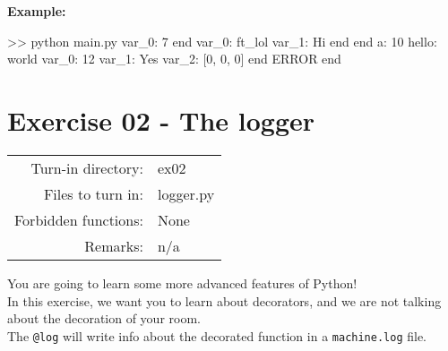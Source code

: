 \documentclass[]{article}
\newenvironment{Shaded}{\begin{snugshade}}{\end{snugshade}}
\newcommand{\NormalTok}[1]{\textcolor[rgb]{0.81,0.81,0.76}{#1}}
\begin{document}
\textbf{Example:}

\begin{Shaded}
\begin{Highlighting}[]
\NormalTok{>> python main.py}
\NormalTok{var_0: 7}
\NormalTok{end}
\NormalTok{var_0: ft_lol}
\NormalTok{var_1: Hi}
\NormalTok{end}
\NormalTok{end}
\NormalTok{a: 10}
\NormalTok{hello: world}
\NormalTok{var_0: 12}
\NormalTok{var_1: Yes}
\NormalTok{var_2: [0, 0, 0]}
\NormalTok{end}
\NormalTok{ERROR}
\NormalTok{end}
\end{Highlighting}
\end{Shaded}

\clearpage

\hypertarget{exercise-02---the-logger-1}{%
\section{Exercise 02 - The logger}\label{exercise-02---the-logger-1}}

\begin{longtable}[]{@{}rl@{}}
\toprule
\endhead
Turn-in directory: & ex02\tabularnewline
Files to turn in: & logger.py\tabularnewline
Forbidden functions: & None\tabularnewline
Remarks: & n/a\tabularnewline
\bottomrule
\end{longtable}

You are going to learn some more advanced features of Python!\\
In this exercise, we want you to learn about decorators, and we are not
talking about the decoration of your room.\\
The \texttt{@log} will write info about the decorated function in a
\texttt{machine.log} file.
\end{document}
